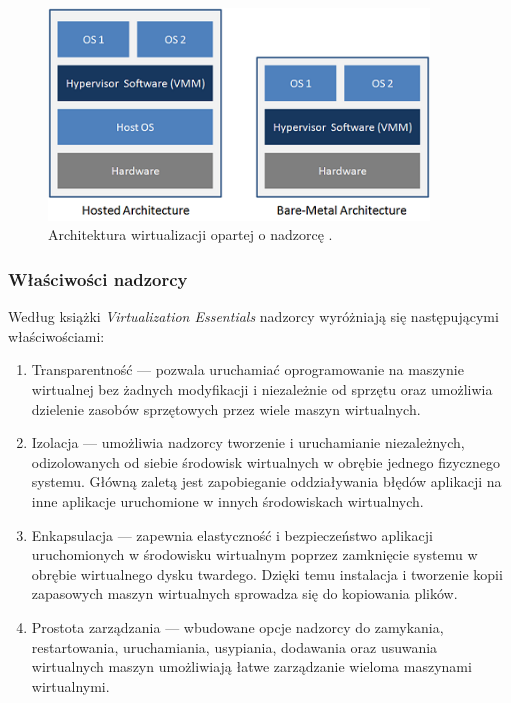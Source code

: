 \documentclass[12pt]{report}
\let\Oldsubsubsection\subsubsection
\renewcommand{\subsubsection}{\FloatBarrier\Oldsubsubsection}
\begin{document}
\begin{figure}[h]
	\centering
	\includegraphics[width=0.9\textwidth]{images/virtualizationArch.png}
	\caption{Architektura wirtualizacji opartej o nadzorcę \cite{hypervisorArchImg}.}
\end{figure}

\subsubsection{Właściwości nadzorcy}
Według książki \textit{Virtualization Essentials} \cite{virtualization} nadzorcy wyróżniają się następującymi właściwościami:
\begin{enumerate}
\item Transparentność --- pozwala uruchamiać oprogramowanie na maszynie wirtualnej bez żadnych modyfikacji i niezależnie od sprzętu oraz umożliwia dzielenie zasobów sprzętowych przez wiele maszyn wirtualnych.
\item Izolacja --- umożliwia nadzorcy tworzenie i uruchamianie niezależnych, odizolowanych od siebie środowisk wirtualnych w obrębie jednego fizycznego systemu. Główną zaletą jest zapobieganie oddziaływania błędów aplikacji na inne aplikacje uruchomione w innych środowiskach wirtualnych.
\item Enkapsulacja --- zapewnia elastyczność i bezpieczeństwo aplikacji uruchomionych w środowisku wirtualnym poprzez zamknięcie systemu w obrębie wirtualnego dysku twardego. Dzięki temu instalacja i tworzenie kopii zapasowych maszyn wirtualnych sprowadza się do kopiowania plików.
\item Prostota zarządzania --- wbudowane opcje nadzorcy do zamykania, restartowania, uruchamiania, usypiania, dodawania oraz usuwania wirtualnych maszyn umożliwiają łatwe zarządzanie wieloma maszynami wirtualnymi.
\end{enumerate}
\end{document}

